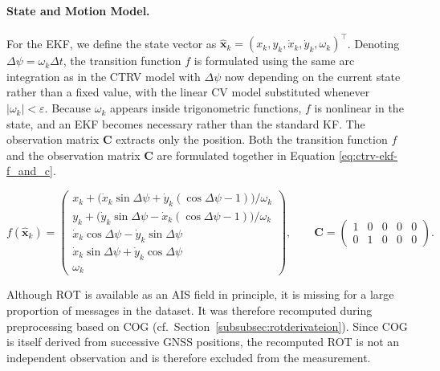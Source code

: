     \paragraph{State and Motion Model.}
    For the \ac{EKF}, we define the state vector as $\hat{\mathbf{x}}_k = (x_k, y_k, \dot{x}_k, \dot{y}_k, \omega_k)^\top$. 
Denoting $\Delta\psi = \omega_k \Delta t$, the transition function $f$ is formulated using the same arc integration as in the \ac{CTRV} model %
with $\Delta\psi$ now depending on the current state rather than a fixed value, %
with the linear \acs{CV} model substituted whenever $|\omega_k| < \varepsilon$.
    Because $\omega_k$ appears inside trigonometric functions, $f$ is nonlinear
    in the state, and an \ac{EKF} becomes necessary rather than the standard
    \ac{KF}. %
    The observation matrix $\mathbf{C}$ extracts only the position. Both the transition function $f$ and the observation matrix $\mathbf{C}$ are formulated together in Equation \ref{eq:ctrv-ekf-f_and_c}.

\begin{equation}
    f(\hat{\mathbf{x}}_k) =
    \begin{pmatrix}
        x_k  + \bigl(\dot{x}_k \sin\Delta\psi + \dot{y}_k(\cos\Delta\psi - 1)\bigr) / \omega_k \\
        y_k  + \bigl(\dot{y}_k \sin\Delta\psi - \dot{x}_k(\cos\Delta\psi - 1)\bigr) / \omega_k \\
        \dot{x}_k \cos\Delta\psi - \dot{y}_k \sin\Delta\psi \\
        \dot{x}_k \sin\Delta\psi + \dot{y}_k \cos\Delta\psi \\
        \omega_k
    \end{pmatrix},
    \qquad
    \mathbf{C} = \begin{pmatrix} 1 & 0 & 0 & 0 & 0 \\ 0 & 1 & 0 & 0 & 0 \end{pmatrix}.
    \label{eq:ctrv-ekf-f_and_c}
\end{equation}
   


    Although \ac{ROT} is available as an \ac{AIS} field in principle, it is
    missing for a large proportion of messages in the dataset. It was therefore
    recomputed during preprocessing based on \ac{COG}
    (cf.\ Section~\ref{subsubsec:rotderivateion}). Since \ac{COG} is itself derived
    from successive \ac{GNSS} positions, the recomputed \ac{ROT} is not an
    independent observation and is therefore excluded from the measurement.
    
